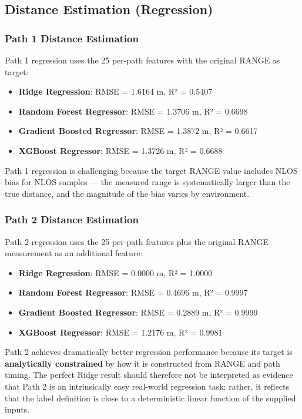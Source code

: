 \documentclass[12pt,a4paper]{article}
\providecommand{\tightlist}{%
  \setlength{\itemsep}{0pt}\setlength{\parskip}{0pt}}
\begin{document}
\subsection{Distance Estimation
(Regression)}\label{distance-estimation-regression}

\subsubsection{Path 1 Distance
Estimation}\label{path-1-distance-estimation}

Path 1 regression uses the 25 per-path features with the original RANGE
as target:

\begin{itemize}
\tightlist
\item
  \textbf{Ridge Regression}: RMSE = 1.6164 m, R² = 0.5407
\item
  \textbf{Random Forest Regressor}: RMSE = 1.3706 m, R² = 0.6698
\item
  \textbf{Gradient Boosted Regressor}: RMSE = 1.3872 m, R² = 0.6617
\item
  \textbf{XGBoost Regressor}: RMSE = 1.3726 m, R² = 0.6688
\end{itemize}

Path 1 regression is challenging because the target RANGE value includes
NLOS bias for NLOS samples --- the measured range is systematically
larger than the true distance, and the magnitude of the bias varies by
environment.

\subsubsection{Path 2 Distance
Estimation}\label{path-2-distance-estimation}

Path 2 regression uses the 25 per-path features plus the original RANGE
measurement as an additional feature:

\begin{itemize}
\tightlist
\item
  \textbf{Ridge Regression}: RMSE = 0.0000 m, R² = 1.0000
\item
  \textbf{Random Forest Regressor}: RMSE = 0.4696 m, R² = 0.9997
\item
  \textbf{Gradient Boosted Regressor}: RMSE = 0.2889 m, R² = 0.9999
\item
  \textbf{XGBoost Regressor}: RMSE = 1.2176 m, R² = 0.9981
\end{itemize}

Path 2 achieves dramatically better regression performance because its
target is \textbf{analytically constrained} by how it is constructed
from RANGE and path timing. The perfect Ridge result should therefore
not be interpreted as evidence that Path 2 is an intrinsically easy
real-world regression task; rather, it reflects that the label
definition is close to a deterministic linear function of the supplied
inputs.
\end{document}
